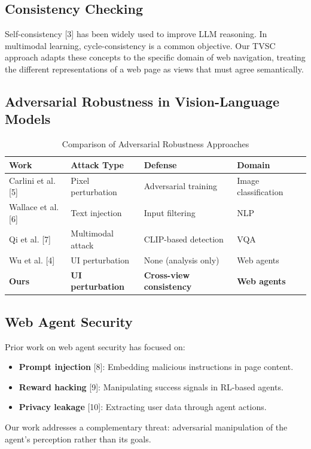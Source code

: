 \documentclass[runningheads]{llncs}
\begin{document}
\subsection{Consistency Checking}
Self-consistency [3] has been widely used to improve LLM reasoning. In multimodal learning, cycle-consistency is a common objective. Our TVSC approach adapts these concepts to the specific domain of web navigation, treating the different representations of a web page as views that must agree semantically.

\subsection{Adversarial Robustness in Vision-Language Models}

\begin{table}[ht]
\caption{Comparison of Adversarial Robustness Approaches}
\centering
\begin{tabular}{|l|l|l|l|}
\hline
Work & Attack Type & Defense & Domain \\
\hline
Carlini et al. [5] & Pixel perturbation & Adversarial training & Image classification \\
Wallace et al. [6] & Text injection & Input filtering & NLP \\
Qi et al. [7] & Multimodal attack & CLIP-based detection & VQA \\
Wu et al. [4] & UI perturbation & None (analysis only) & Web agents \\
\textbf{Ours} & \textbf{UI perturbation} & \textbf{Cross-view consistency} & \textbf{Web agents} \\
\hline
\end{tabular}
\end{table}

\subsection{Web Agent Security}
Prior work on web agent security has focused on:
\begin{itemize}
    \item \textbf{Prompt injection} [8]: Embedding malicious instructions in page content.
    \item \textbf{Reward hacking} [9]: Manipulating success signals in RL-based agents.
    \item \textbf{Privacy leakage} [10]: Extracting user data through agent actions.
\end{itemize}
Our work addresses a complementary threat: adversarial manipulation of the agent's perception rather than its goals.
\end{document}
